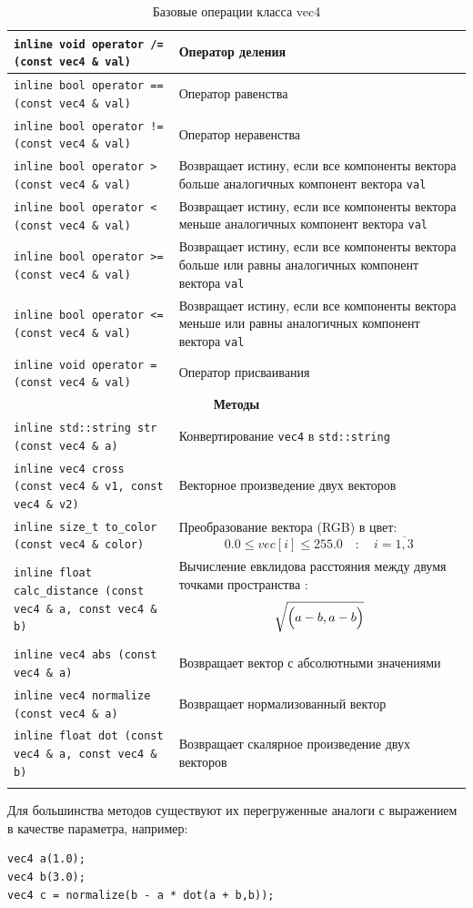 \documentclass[12pt, a4paper, utf8]{article}
\def\cf#1{\texttt{\small #1}}
\begin{document}
\begin{center}
\begin{longtable}{|p{5cm}|p{10cm}|}
\cf{inline void operator /= (const vec4 \& val)} & Оператор деления \\ \hline
\cf{inline bool operator == (const vec4 \& val)} & Оператор равенства \\ \hline
\cf{inline bool operator != (const vec4 \& val)} & Оператор неравенства \\ \hline
\cf{inline bool operator > (const vec4 \& val)} & Возвращает истину, если все компоненты вектора больше аналогичных компонент вектора \cf{val}  \\ \hline
\cf{inline bool operator < (const vec4 \& val)} & Возвращает истину, если все компоненты вектора меньше аналогичных компонент вектора \cf{val} \\ \hline
\cf{inline bool operator >= (const vec4 \& val)} & Возвращает истину, если все компоненты вектора больше или равны аналогичных компонент вектора \cf{val} \\ \hline
\cf{inline bool operator <= (const vec4 \& val)} & Возвращает истину, если все компоненты вектора меньше или равны аналогичных компонент вектора \cf{val} \\ \hline
\cf{inline void operator = (const vec4 \& val)} & Оператор присваивания \\ \hline
\multicolumn{2}{|c|}{\bf Методы} \\ \hline
\cf{inline std::string str (const vec4 \& a)} & Конвертирование \cf{vec4} в \cf{std::string} \\ \hline
\cf{inline vec4 cross (const vec4 \& v1, const vec4 \& v2)} & Векторное произведение двух векторов \\ \hline
\cf{inline size\_t to\_color (const vec4 \& color)} & Преобразование вектора (RGB) в цвет: $$ 0.0 \le vec[i] \le 255.0 \quad : \quad i = \overline{1,3} $$ \\ \hline
\cf{inline float calc\_distance (const vec4 \& a, const vec4 \& b)} & Вычисление евклидова расстояния между двумя точками пространства : 
$$ \sqrt{\Bigl( a-b, a-b \Bigr)} $$ \\ \hline
\cf{inline vec4 abs (const vec4 \& a)} & Возвращает вектор с абсолютными значениями \\ \hline
\cf{inline vec4 normalize (const vec4 \& a)} & Возвращает нормализованный вектор \\ \hline
\cf{inline float dot (const vec4 \& a, const vec4 \& b)} & Возвращает скалярное произведение двух векторов \\ \hline
\caption{Базовые операции класса vec4}\label{tab:base_op_vec4}
\end{longtable}
\end{center}
Для большинства методов существуют их перегруженные аналоги с выражением в качестве параметра, например:
\begin{verbatim}
vec4 a(1.0);
vec4 b(3.0);
vec4 c = normalize(b - a * dot(a + b,b));
\end{verbatim}
\end{document}
